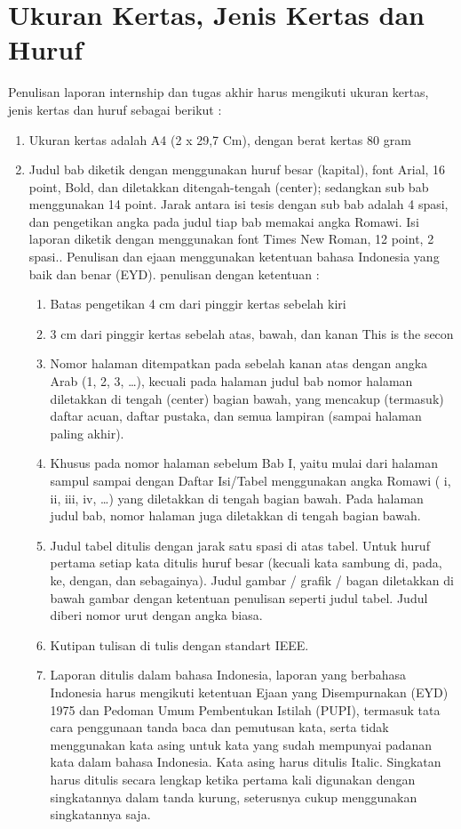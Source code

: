 \section{Ukuran Kertas, Jenis Kertas dan Huruf}
Penulisan laporan internship dan tugas akhir harus mengikuti ukuran kertas, jenis kertas dan huruf sebagai berikut :
\begin{enumerate}
\item Ukuran kertas adalah A4 (2 x 29,7 Cm), dengan berat kertas 80 gram
\item Judul bab diketik dengan menggunakan huruf besar (kapital), font Arial, 16 point, Bold, dan diletakkan ditengah-tengah (center); sedangkan sub bab menggunakan 14 point. Jarak antara isi tesis dengan sub bab adalah 4 spasi, dan pengetikan angka pada judul tiap bab memakai angka Romawi. Isi laporan diketik dengan menggunakan font Times New Roman, 12 point, 2 spasi.. Penulisan dan ejaan menggunakan ketentuan bahasa Indonesia yang baik dan benar (EYD). penulisan dengan ketentuan : \begin{enumerate}
\item Batas pengetikan 4 cm dari pinggir kertas sebelah kiri
\item 3 cm dari pinggir kertas sebelah atas, bawah, dan kanan
This is the secon
\item Nomor halaman ditempatkan pada sebelah kanan atas dengan angka Arab (1, 2, 3, …), kecuali pada halaman judul bab nomor halaman diletakkan di tengah (center) bagian bawah, yang mencakup (termasuk) daftar acuan, daftar pustaka, dan semua lampiran (sampai halaman paling akhir).
\item Khusus pada nomor halaman sebelum Bab I, yaitu mulai dari halaman sampul sampai dengan Daftar Isi/Tabel menggunakan angka Romawi ( i, ii, iii, iv, …) yang diletakkan di tengah bagian bawah. Pada halaman judul bab, nomor halaman juga diletakkan di tengah bagian bawah.
\item Judul tabel ditulis dengan jarak satu spasi di atas tabel. Untuk huruf pertama setiap kata ditulis huruf besar (kecuali kata sambung di, pada, ke, dengan, dan sebagainya). Judul gambar / grafik / bagan diletakkan di bawah gambar dengan ketentuan penulisan seperti judul tabel. Judul diberi nomor urut dengan angka biasa.
\item Kutipan tulisan di tulis dengan standart IEEE.
\item Laporan ditulis dalam bahasa Indonesia, laporan yang berbahasa Indonesia harus mengikuti ketentuan Ejaan yang Disempurnakan (EYD) 1975 dan Pedoman Umum Pembentukan Istilah (PUPI), termasuk tata cara penggunaan tanda baca dan pemutusan kata, serta tidak menggunakan kata asing untuk kata yang sudah mempunyai padanan kata dalam bahasa Indonesia. Kata asing harus ditulis Italic. Singkatan harus ditulis secara lengkap ketika pertama kali digunakan dengan singkatannya dalam tanda kurung, seterusnya cukup menggunakan singkatannya saja.
\end{enumerate}

\end{enumerate}
